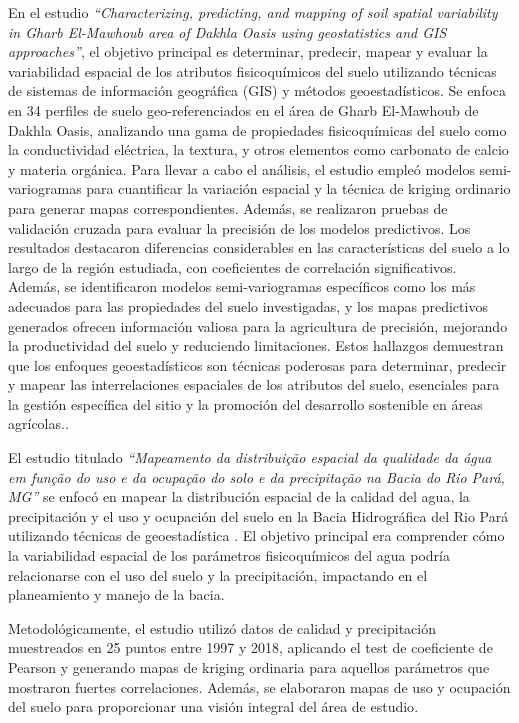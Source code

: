 En el estudio \textit{``Characterizing, predicting, and mapping of soil spatial variability in Gharb El-Mawhoub area of Dakhla Oasis using geostatistics and GIS approaches''}, el objetivo principal es determinar, predecir, mapear y evaluar la variabilidad espacial de los atributos fisicoquímicos del suelo utilizando técnicas de sistemas de información geográfica (GIS) y métodos geoestadísticos. Se enfoca en 34 perfiles de suelo geo-referenciados en el área de Gharb El-Mawhoub de Dakhla Oasis, analizando una gama de propiedades fisicoquímicas del suelo como la conductividad eléctrica, la textura, y otros elementos como carbonato de calcio y materia orgánica. Para llevar a cabo el análisis, el estudio empleó modelos semi-variogramas para cuantificar la variación espacial y la técnica de kriging ordinario para generar mapas correspondientes. Además, se realizaron pruebas de validación cruzada para evaluar la precisión de los modelos predictivos. Los resultados destacaron diferencias considerables en las características del suelo a lo largo de la región estudiada, con coeficientes de correlación significativos. Además, se identificaron modelos semi-variogramas específicos como los más adecuados para las propiedades del suelo investigadas, y los mapas predictivos generados ofrecen información valiosa para la agricultura de precisión, mejorando la productividad del suelo y reduciendo limitaciones. Estos hallazgos demuestran que los enfoques geoestadísticos son técnicas poderosas para determinar, predecir y mapear las interrelaciones espaciales de los atributos del suelo, esenciales para la gestión específica del sitio y la promoción del desarrollo sostenible en áreas agrícolas.\cite{Selmy2022}.

El estudio titulado \textit{``Mapeamento da distribuição espacial da qualidade da água em função do uso e da ocupação do solo e da precipitação na Bacia do Rio Pará, MG''} se enfocó en mapear la distribución espacial de la calidad del agua, la precipitación y el uso y ocupación del suelo en la Bacia Hidrográfica del Rio Pará utilizando técnicas de geoestadística \cite{sousa}. El objetivo principal era comprender cómo la variabilidad espacial de los parámetros fisicoquímicos del agua podría relacionarse con el uso del suelo y la precipitación, impactando en el planeamiento y manejo de la bacia. 

Metodológicamente, el estudio utilizó datos de calidad y precipitación muestreados en 25 puntos entre 1997 y 2018, aplicando el test de coeficiente de Pearson y generando mapas de kriging ordinaria para aquellos parámetros que mostraron fuertes correlaciones. Además, se elaboraron mapas de uso y ocupación del suelo para proporcionar una visión integral del área de estudio\cite{sousa}.

